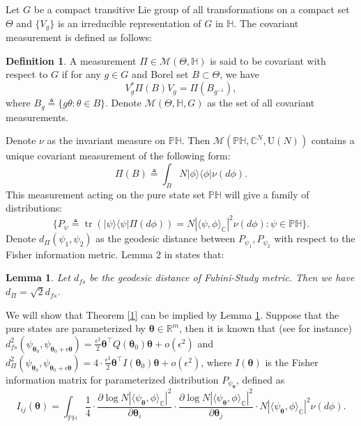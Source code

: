\documentclass{amsart}
\theoremstyle{plain}
\newtheorem{lemma}{Lemma}
\theoremstyle{definition}
\newtheorem{defn}[theorem]{Definition}
\theoremstyle{remark}
\newcommand{\RR}{\mathbb{R}}
\newcommand{\CC}{\mathbb{C}}
\newcommand{\eps}{\epsilon}
\begin{document}
Let $G$ be a compact transitive Lie group of all transformations on a compact set $\Theta$ and $\{V_g\}$ is an irreducible representation of $G$ in $\mathbb H$. The covariant measurement is defined as follows:
\begin{defn}
    A measurement $\Pi\in\mathcal M(\Theta,\mathbb H)$ is said to be covariant with respect to $G$ if for any $g\in G$ and Borel set $B\subset\Theta$, we have
    \begin{equation}
        V_g^*\Pi(B)V_g=\Pi(B_{g^{-1}}),
    \end{equation}
    where $B_g\triangleq\{g\theta:\theta\in B\}$. Denote $\mathcal M(\Theta,\mathbb H,G)$ as the set of all covariant measurements.
\end{defn}
Denote $\nu$ as the invariant measure on $\mathbb P\mathbb H$. Then $\mathcal M(\mathbb P\mathbb H,\CC^N,\mathrm U(N))$ contains a unique covariant measurement of the following form:
\begin{equation}
\label{def:covariant}
\Pi(B)\triangleq \int_B N|\phi\rangle\langle\phi| \nu(d\phi).
\end{equation}
This measurement acting on the pure state set $\mathbb P\mathbb H$ will give a family of distributions:
\[\{P_\psi\triangleq \operatorname{tr}(|\psi\rangle\langle\psi|\Pi(d\phi))= N|\langle\psi,\phi\rangle_{\CC}|^2\nu (d\phi):\psi\in\mathbb P\mathbb H\}.\] 
Denote $d_\Pi(\psi_1,\psi_2)$ as the geodesic distance between $P_{\psi_1},P_{\psi_2}$ with respect to the Fisher information metric. Lemma 2 in \cite{MasahitoHayashi_1998} states that:
\begin{lemma}
\label{lem in Hayashi}
    Let $d_{fs}$ be the geodesic distance of Fubini-Study metric. Then we have $d_\Pi=\sqrt{2}d_{fs}$.
\end{lemma}
We will show that Theorem \ref{1} can be implied by 
Lemma \ref{lem in Hayashi}. Suppose that the pure states are parameterized by $\bm\theta\in\RR^m$, then it is known that (see \cite{kolotouros2024randomnatural} for instance) $d^2_{fs}(\psi_{\bm\theta_0},\psi_{\bm\theta_0+\epsilon \bm\theta})=\frac{\eps^2}{2}\bm\theta^\top Q(\bm\theta_0)\bm\theta+o(\epsilon^2)$ and $d^2_\Pi(\psi_{\bm\theta_0},\psi_{\bm\theta_0+\epsilon \bm\theta})=4\cdot \frac{\epsilon^2}{2}\bm\theta^\top I(\bm\theta_0)\bm\theta+o(\epsilon^2)$, where $I(\bm\theta)$ is the Fisher information matrix for parameterized distribution $P_{\psi_{\bm\theta}}$, defined as
\begin{equation}
\label{covaraint information matrix}
   I_{ij}(\bm\theta)=\int_{\mathbb P\mathbb H}\frac{1}{4}\cdot \frac{\partial\log N|\langle\psi_{\bm\theta},\phi\rangle_{\CC}|^2}{\partial \bm\theta_i}\cdot \frac{\partial\log N|\langle\psi_{\bm\theta},\phi\rangle_{\CC}|^2}{\partial \bm\theta_j}\cdot N|\langle\psi_{\bm\theta},\phi\rangle_{\CC}|^2\nu (d\phi). 
\end{equation}
\end{document}
